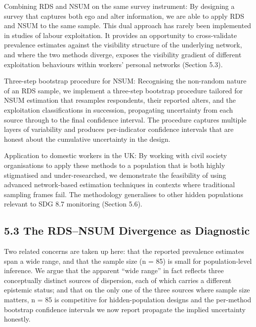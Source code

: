 \documentclass[
  12pt,
  letterpaper,
  DIV=11,
  numbers=noendperiod]{scrartcl}
\begin{document}
Combining RDS and NSUM on the same survey instrument: By designing a
survey that captures both ego and alter information, we are able to
apply RDS and NSUM to the same sample. This dual approach has rarely
been implemented in studies of labour exploitation. It provides an
opportunity to cross-validate prevalence estimates against the
visibility structure of the underlying network, and where the two
methods diverge, exposes the visibility gradient of different
exploitation behaviours within workers' personal networks (Section 5.3).

Three-step bootstrap procedure for NSUM: Recognising the non-random
nature of an RDS sample, we implement a three-step bootstrap procedure
tailored for NSUM estimation that resamples respondents, their reported
alters, and the exploitation classifications in succession, propagating
uncertainty from each source through to the final confidence interval.
The procedure captures multiple layers of variability and produces
per-indicator confidence intervals that are honest about the cumulative
uncertainty in the design.

Application to domestic workers in the UK: By working with civil society
organisations to apply these methods to a population that is both highly
stigmatised and under-researched, we demonstrate the feasibility of
using advanced network-based estimation techniques in contexts where
traditional sampling frames fail. The methodology generalises to other
hidden populations relevant to SDG 8.7 monitoring (Section 5.6).

\subsection{5.3 The RDS--NSUM Divergence as
Diagnostic}\label{the-rdsnsum-divergence-as-diagnostic}

Two related concerns are taken up here: that the reported prevalence
estimates span a wide range, and that the sample size (n = 85) is small
for population-level inference. We argue that the apparent ``wide
range'' in fact reflects three conceptually distinct sources of
dispersion, each of which carries a different epistemic status; and that
on the only one of the three sources where sample size matters, n = 85
is competitive for hidden-population designs and the per-method
bootstrap confidence intervals we now report propagate the implied
uncertainty honestly.
\end{document}
